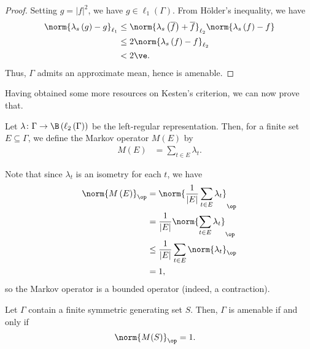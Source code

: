 \documentclass[10pt]{mypackage}
\begin{document}
\begin{proof}
  Setting $g = \left\vert f \right\vert^2$, we have $g\in \ell_1\left(\Gamma\right)$. From Hölder's inequality, we have
  \begin{align*}
    \norm{\lambda_s\left(g\right) - g}_{\ell_1} &\leq \norm{\lambda_s\left(\overline{f}\right) + \overline{f}}_{\ell_2} \norm{\lambda_s\left(f\right) - f}\\
                                                &\leq 2\norm{\lambda_s\left(f\right) - f}_{\ell_2}\\
                                                &< 2\ve.
  \end{align*}
  Thus, $\Gamma$ admits an approximate mean, hence is amenable.
\end{proof}
Having obtained some more resources on Kesten's criterion, we can now prove that.
\begin{definition}
  Let $\lambda\colon \Gamma\rightarrow \B\left(\ell_2\left(\Gamma\right)\right)$ be the left-regular representation. Then, for a finite set $E\subseteq \Gamma$, we define the Markov operator $M\left(E\right)$ by
  \begin{align*}
    M\left(E\right) &= \sum_{t\in E}\lambda_t.
  \end{align*}
\end{definition}
Note that since $\lambda_t$ is an isometry for each $t$, we have
\begin{align*}
  \norm{M\left(E\right)}_{\op} &= \norm{\frac{1}{\left\vert E \right\vert}\sum_{t\in E}\lambda_t}_{\op}\\
                               &= \frac{1}{\left\vert E \right\vert} \norm{\sum_{t\in E}\lambda_t}_{\op}\\
                               &\leq \frac{1}{\left\vert E \right\vert}\sum_{t\in E}\norm{\lambda_t}_{\op}\\
                               &= 1,
\end{align*}
so the Markov operator is a bounded operator (indeed, a contraction).
\begin{theorem}
  Let $\Gamma$ contain a finite symmetric generating set $S$. Then, $\Gamma$ is amenable if and only if
  \begin{align*}
    \norm{M(S)}_{\op} &= 1.
  \end{align*}
\end{theorem}
\end{document}

